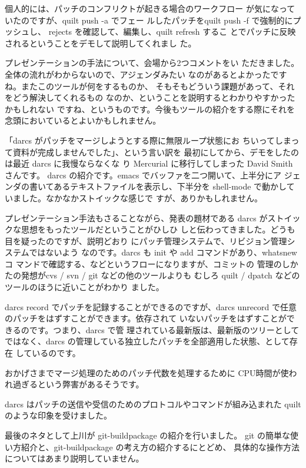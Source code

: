 \documentclass[mingoth,a4paper]{jsarticle}
\begin{document}
個人的には、パッチのコンフリクトが起きる場合のワークフロー
が気になっていたのですが、quilt push -a でフェー
ルしたパッチをquilt push -f で強制的にプッシュし、
rejects を確認して、編集し、quilt refresh するこ
とでパッチに反映されるということをデモして説明してくれまし
た。

プレゼンテーションの手法について、会場から2つコメントをい
ただきました。全体の流れがわからないので、アジェンダみたい
なのがあるとよかったですね。またこのツールが何をするものか、
そもそもどういう課題があって、それをどう解決してくれるもの
なのか、ということを説明するとわかりやすかったかもしれない
ですね、というものです。今後もツールの紹介をする際にそれを
念頭においているとよいかもしれません。


「darcs がパッチをマージしようとする際に無限ループ状態にお
ちいってしまって資料が完成しませんでした」、という言い訳を
最初にしてから、デモをしたのは最近 darcs に我慢ならなくな
り Mercurial に移行してしまった David Smith さんです。
darcs の紹介です。emacs でバッファを二つ開いて、上半分にア
ジェンダの書いてあるテキストファイルを表示し、下半分を 
shell-mode で動かしていました。なかなかストイックな感じで
すが、ありかもしれません。

プレゼンテーション手法もさることながら、発表の題材である 
darcs がストイックな思想をもったツールだということがひしひ
しと伝わってきました。どうも目を疑ったのですが、説明どおり
にパッチ管理システムで、リビジョン管理システムではないよう
なのです。darcs も init や add コマンドがあり、whatsnew コ
マンドで確認する、などというフローになりますが、コミットの
管理のしかたの発想がcvs / svn / git などの他のツールよりも
むしろ quilt / dpatch などのツールのほうに近いことがわかり
ました。

darcs record でパッチを記録することができるのですが、darcs
unrecord で任意のパッチをはずすことができます。依存されて
いないパッチをはずすことができるのです。つまり、darcs で管
理されている最新版は、最新版のツリーとしてではなく、darcs 
の管理している独立したパッチを全部適用した状態、として存在
しているのです。

おかげさまでマージ処理のためのパッチ代数を処理するために
CPU時間が使われ過ぎるという弊害があるそうです。

darcs はパッチの送信や受信のためのプロトコルやコマンドが組み込まれた
quilt のような印象を受けました。


最後のネタとして上川が git-buildpackage の紹介を行いました。
git の簡単な使い方紹介と、git-buildpackage の考え方の紹介するにとどめ、
具体的な操作方法についてはあまり説明していません。
\end{document}
